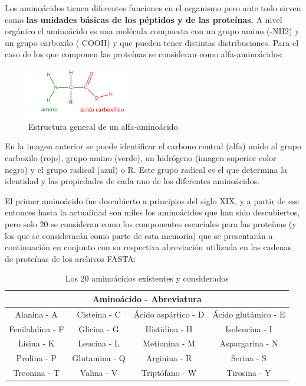 Los aminoácidos tienen diferentes funciones en el organismo \cite{amino} pero ante todo sirven como \textbf{las unidades básicas de los péptidos y de las proteínas.} A nivel orgánico el aminoácido es una molécula compuesta con un grupo amino (-NH2) y un grupo carboxilo (-COOH) y que pueden tener distintas distribuciones. Para el caso de los que componen las proteínas se consideran como alfa-aminoácidos:

\begin{figure}[h]
    \centering
    \includegraphics[width=0.4\textwidth]{./images/aminoacido}
    \caption{Estructura general de un alfa-aminoácido}
    \label{fig:image3}
\end{figure}

En la imagen anterior se puede identificar el carbono central (alfa) unido al grupo carboxilo (rojo), grupo amino (verde), un hidrógeno (imagen superior color negro) y el grupo radical (azul) o R. Este grupo radical es el que determina la identidad y las propiedades de cada uno de los diferentes aminoácidos.

El primer aminoácido fue descubierto a principios del siglo XIX, y a partir de ese entonces hasta la actualidad son miles los aminoácidos que han sido descubiertos, pero solo 20 se consideran como los componentes esenciales para las proteínas (y los que se considerarán como parte de esta memoria) que se presentarán a continuación en conjunto con su respectiva abreviación utilizada en las cadenas de proteínas de los archivos FASTA:

\begin{table}[H]
\centering
\label{my-label5}
\begin{tabular}{|c c c c|}
\hline
\multicolumn{4}{|c|}{Aminoácido - Abreviatura}\\ \hline
Alanina - A      & Cisteína - C       &      Ácido aspártico - D     & Ácido glutámico - E                     \\
Fenilalalina - F      &  Glicina - G           & Histidina - H     & Isoleucina - I                \\
Lisina - K      & Leucina - L            & Metionina - M           & Aspargarina - N          \\
Prolina - P      & Glutamina - Q          & Arginina - R                  & Serina - S                  \\
Treonina - T      & Valina - V          & Triptófano - W                      & Tirosina - Y   \\ \hline
\end{tabular}
\caption{Los 20 aminoácidos existentes y considerados}
\end{table}

